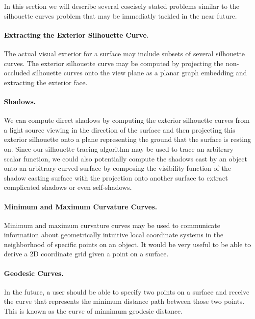 \documentclass[12pt, letterpaper]{article}
\begin{document}
	In this section we will describe several coscisely stated problems similar to the silhouette curves problem that may be immediatly tackled in the near future.

		\paragraph{Extracting the Exterior Silhouette Curve.}
		The actual visual exterior for a surface may include subsets of several silhouette curves. The exterior silhouette curve may be computed by projecting the
		non-occluded silhouette curves onto the view plane as a planar graph embedding and extracting the exterior face.		

		\paragraph{Shadows.}
		We can compute direct shadows	by computing the exterior silhouette curves from a light source viewing in the direction of the surface and then projecting this exterior silhouette 
		onto a plane representing the ground that the surface is resting on. Since our silhouette tracing algorithm may be used to trace an arbitrary
		scalar function, we could also potentially compute the shadows cast by an object onto an arbitrary curved surface by composing the 
		visibility function of the shadow casting surface with the projection onto another surface to extract complicated shadows or even self-shadows.

		\paragraph{Minimum and Maximum Curvature Curves.}
		Minimum and maximum curvature curves may be used to communicate information about geometrically intuitive local coordinate systems in the neighborhood of specific points on an object.
		It would be very useful to be able to derive a 2D coordinate grid given a point on a surface.
	
		\paragraph{Geodesic Curves.}
		In the future, a user should be able to specify two points on a surface and receive the curve that represents the minimum distance path between those two points.
		This is known as the curve of minnimum geodesic distance.
	
\end{document}
